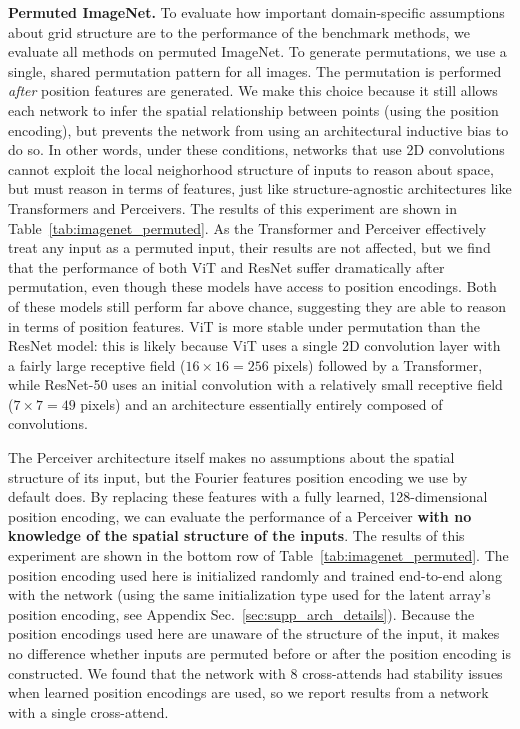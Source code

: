  \textbf{Permuted ImageNet.} To evaluate how important domain-specific assumptions about grid structure are to the performance of the benchmark methods, we evaluate all methods on permuted ImageNet. To generate permutations, we use a single, shared permutation pattern for all images. The permutation is performed \textit{after} position features are generated. We make this choice because it still allows each network to infer the spatial relationship between points (using the position encoding), but prevents the network from using an architectural inductive bias to do so. In other words, under these conditions, networks that use 2D convolutions cannot exploit the local neighorhood structure of inputs to reason about space, but must reason in terms of features, just like structure-agnostic architectures like Transformers and Perceivers. The results of this experiment are shown in Table~\ref{tab:imagenet_permuted}. As the Transformer and Perceiver effectively treat any input as a permuted input, their results are not affected, but we find that the performance of both ViT and ResNet suffer dramatically after permutation, even though these models have access to position encodings. Both of these models still perform far above chance, suggesting they are able to reason in terms of position features. ViT is more stable under permutation than the ResNet model: this is likely because ViT uses a single 2D convolution layer with a fairly large receptive field ($16 \times 16 = 256$ pixels) followed by a Transformer, while ResNet-50 uses an initial convolution with a relatively small receptive field ($7 \times 7 = 49$ pixels) and an architecture essentially entirely composed of convolutions.

The Perceiver architecture itself makes no assumptions about the spatial structure of its input, but the Fourier features position encoding we use by default does. By replacing these features with a fully learned, 128-dimensional position encoding, we can evaluate the performance of a Perceiver \textbf{with no knowledge of the spatial structure of the inputs}. The results of this experiment are shown in the bottom row of Table~\ref{tab:imagenet_permuted}. The position encoding used here is initialized randomly and trained end-to-end along with the network (using the same initialization type used for the latent array's position encoding, see Appendix Sec.~\ref{sec:supp_arch_details}). Because the position encodings used here are unaware of the structure of the input, it makes no difference whether inputs are permuted before or after the position encoding is constructed. We found that the network with 8 cross-attends had stability issues when learned position encodings are used, so we report results from a network with a single cross-attend.

